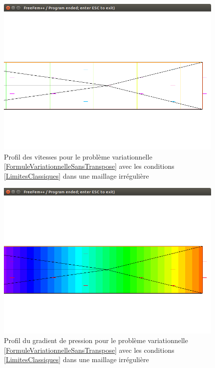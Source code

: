 \documentclass[11pt,a4paper]{article}
\numberwithin{equation}{subsection}
\numberwithin{figure}{subsection}
\begin{document}
\begin{figure}
\centering
\includegraphics[scale=0.4]{StokesConditionsClassiquesVitessesIrregulier.png}
\caption{Profil des vitesses pour le problème variationnelle \ref{FormuleVariationnelleSansTranspose} avec les conditions \ref{LimitesClassiques} dans une maillage irrégulière}
\label{StokesConditionsClassiquesVitessesIrregulier}
\end{figure}	

\begin{figure}
\centering
\includegraphics[scale=0.4]{StokesConditionsClassiquesPressionIrregulier.png}
\caption{Profil du gradient de pression pour le problème variationnelle \ref{FormuleVariationnelleSansTranspose} avec les conditions \ref{LimitesClassiques} dans une maillage irrégulière}
\label{StokesConditionsClassiquesPressionIrregulier}
\end{figure}
\end{document}
